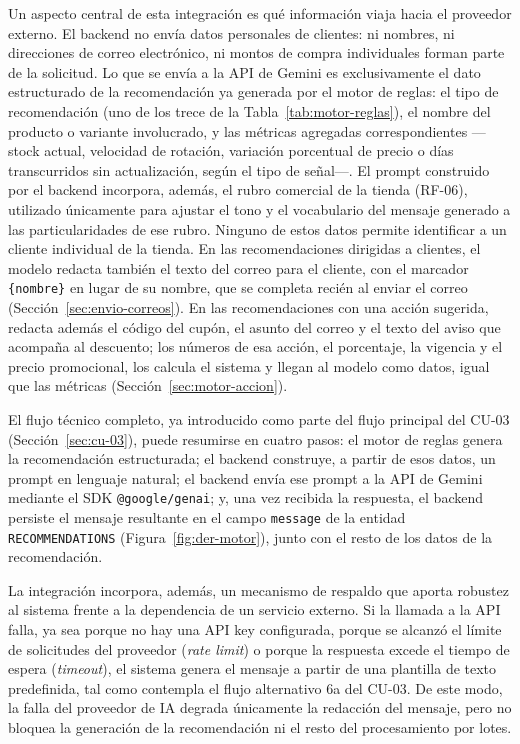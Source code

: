 Un aspecto central de esta integración es qué información viaja hacia el proveedor externo. El backend no envía datos personales de clientes: ni nombres, ni direcciones de correo electrónico, ni montos de compra individuales forman parte de la solicitud. Lo que se envía a la API de Gemini es exclusivamente el dato estructurado de la recomendación ya generada por el motor de reglas: el tipo de recomendación (uno de los trece de la Tabla~\ref{tab:motor-reglas}), el nombre del producto o variante involucrado, y las métricas agregadas correspondientes ---stock actual, velocidad de rotación, variación porcentual de precio o días transcurridos sin actualización, según el tipo de señal---. El prompt construido por el backend incorpora, además, el rubro comercial de la tienda (RF-06), utilizado únicamente para ajustar el tono y el vocabulario del mensaje generado a las particularidades de ese rubro. Ninguno de estos datos permite identificar a un cliente individual de la tienda. En las recomendaciones dirigidas a clientes, el modelo redacta también el texto del correo para el cliente, con el marcador \texttt{\{nombre\}} en lugar de su nombre, que se completa recién al enviar el correo (Sección~\ref{sec:envio-correos}).
En las recomendaciones con una acción sugerida, redacta además el código del cupón, el asunto del correo y el texto del aviso que acompaña al descuento; los números de esa acción, el porcentaje, la vigencia y el precio promocional, los calcula el sistema y llegan al modelo como datos, igual que las métricas (Sección~\ref{sec:motor-accion}).

El flujo técnico completo, ya introducido como parte del flujo principal del CU-03 (Sección~\ref{sec:cu-03}), puede resumirse en cuatro pasos: el motor de reglas genera la recomendación estructurada; el backend construye, a partir de esos datos, un prompt en lenguaje natural; el backend envía ese prompt a la API de Gemini mediante el SDK \texttt{@google/genai}; y, una vez recibida la respuesta, el backend persiste el mensaje resultante en el campo \texttt{message} de la entidad \texttt{RECOMMENDATIONS} (Figura~\ref{fig:der-motor}), junto con el resto de los datos de la recomendación.

La integración incorpora, además, un mecanismo de respaldo que aporta robustez al sistema frente a la dependencia de un servicio externo. Si la llamada a la API falla, ya sea porque no hay una API key configurada, porque se alcanzó el límite de solicitudes del proveedor (\emph{rate limit}) o porque la respuesta excede el tiempo de espera (\emph{timeout}), el sistema genera el mensaje a partir de una plantilla de texto predefinida, tal como contempla el flujo alternativo 6a del CU-03. De este modo, la falla del proveedor de IA degrada únicamente la redacción del mensaje, pero no bloquea la generación de la recomendación ni el resto del procesamiento por lotes.


